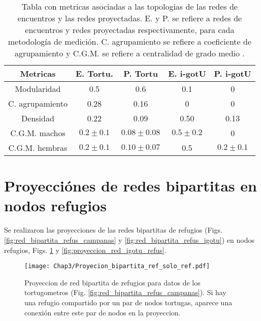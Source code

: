 \begin{table}[ht]
    \centering
    \begin{tabular}{|c|c|c|c|c|}
    \hline
    Metricas          & E. Tortu.   & P. Tortu      & E. i-gotU   & P. i-gotU    \\ \hline
    Modularidad       & 0.5         & 0.6           & 0.1        & 0            \\ \hline
    C. agrupamiento & 0.28        & 0.16          & 0           & 0            \\ \hline
    Densidad          & 0.22        & 0.09          & 0.50         & 0.13          \\ \hline
    C.G.M. machos     & $0.2\pm0.1$ & $0.08\pm0.08$ & $0.5\pm0.2$ & 0            \\ \hline
    C.G.M. hembras    & $0.2\pm0.1$ & $0.10\pm0.07$ & 0.5         & $0.2\pm0.1 $ \\ \hline
    \end{tabular}
    \caption[Tabla con metricas asociadas a las topologias de las redes de encuentros y las redes proyectadas.]{Tabla con metricas asociadas a las topologias de las redes de encuentros y las redes proyectadas. E. y P. se refiere a redes de encuentros y redes proyectadas respectivamente, para cada metodología de medición. C. agrupamiento se refiere a coeficiente de agrupamiento y C.G.M. se refiere a centralidad de grado medio .}
    \label{tab:metricas_topologia_redes}
\end{table}

\section{Proyecciónes de redes bipartitas en nodos refugios}
Se realizaron las proyecciones de las redes bipartitas de refugios (Figs. \ref{fig:red_bipartita_refus_campanas} y \ref{fig:red_bipartita_refus_igotu}) en nodos refugios, Figs. \ref{fig:proyeccion_red_campanas_refus} y \ref{fig:proyeccion_red_igotu_refus}.


\begin{figure}[ht]
    \begin{center}
        \texttt{[image: Chap3/Proyecion\_bipartita\_ref\_solo\_ref.pdf]}
        \caption[Proyeccion  de red bipartita de refugios para datos de los tortugometros en nodos refugios.]{Proyeccion  de red bipartita de refugios para datos de los tortugometros (Fig. \ref{fig:red_bipartita_refus_campanas}). Si hay una refugio compartido por un par de nodos tortugas, aparece una conexión entre este par de nodos en la proyeccion. } 
        \label{fig:proyeccion_red_campanas_refus}
        
        \end{center}
\end{figure} 

